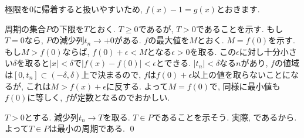 \begin{point}
極限を0に帰着すると扱いやすいため, $f(x) - 1 = g(x)$とおきます.
\end{point}
\begin{egans}
\end{egans}

\begin{egans}
周期の集合$P$の下限を$T$とおく. $T\geq 0$であるが, $T>0$であることを示す. もし$T=0$なら, $P$の減少列$t_n \to +0$がある. $f$の最大値を$M$とおく. $M=f(0)$を示す. もし$M>f(0)$ならば, $f(0) + \epsilon < M$となる$\epsilon>0$を取る. この$\epsilon$に対し十分小さい$\delta$を取ると$|x|<\delta$で$|f(x) - f(0)| < \epsilon$とできる. $|t_n| < \delta$なる$n$があり, $f$の値域は$[0,t_n]\subset (-\delta, \delta)$上で決まるので, $f$は$f(0) + \epsilon$以上の値を取らないことになるが, これは$M>f(x) + \epsilon$に反する. よって$M=f(0)$で, 同様に最小値も$f(0)$に等しく, $f$が定数となるのでおかしい.\par
$T>0$とする. 減少列$t_n \to T$を取る. $T\in P$であることを示そう. 実際,
であるから. よって$T\in P$は最小の周期である. \qed
\end{egans}






